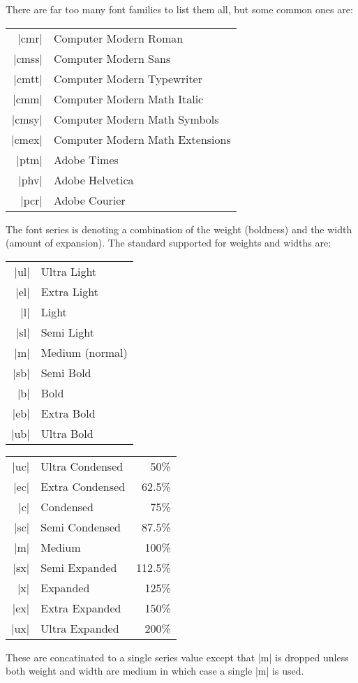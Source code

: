 \documentclass{ltxguide}[1995/11/28]
\begin{document}
There are far too many font families to list them all, but some common
ones are:
\begin{center}
\begin{minipage}{.7\linewidth}
   \begin{tabular}{rl}
      |cmr|  & Computer Modern Roman \\
      |cmss| & Computer Modern Sans \\
      |cmtt| & Computer Modern Typewriter \\
      |cmm|  & Computer Modern Math Italic \\
      |cmsy| & Computer Modern Math Symbols \\
      |cmex| & Computer Modern Math Extensions \\
      |ptm|  & Adobe Times \\
      |phv|  & Adobe Helvetica \\
      |pcr|  & Adobe Courier
   \end{tabular}
\end{minipage}
\end{center}
The font series is denoting a combination of the weight (boldness) and
the width (amount of expansion).  The standard supported for weights and widths
are:
\begin{center}
   \begin{tabular}{rl}
  |ul| &       Ultra Light     \\
  |el| &       Extra Light     \\
  |l|  &       Light          \\
  |sl| &       Semi Light      \\
  |m|  &       Medium (normal)\\
  |sb| &       Semi Bold       \\
  |b|  &       Bold           \\
  |eb| &       Extra Bold      \\
  |ub| &       Ultra Bold      \\
   \end{tabular}
\qquad
   \begin{tabular}{rlr}
       |uc|  &       Ultra Condensed  &  50\%    \\
       |ec|  &       Extra Condensed  &  62.5\%  \\
       |c|   &       Condensed       &  75\%    \\
       |sc|  &       Semi Condensed   &  87.5\%  \\
        |m|  &       Medium          &  100\%   \\
       |sx|  &       Semi Expanded    &  112.5\% \\
        |x|  &       Expanded        &  125\%   \\
       |ex|  &       Extra Expanded   &  150\%   \\
       |ux|  &       Ultra Expanded   &  200\%   \\
   \end{tabular}
\end{center}
These are concatinated to a single series value except that |m| is
dropped unless both weight and width are medium in which case a single
|m| is used.
\end{document}
